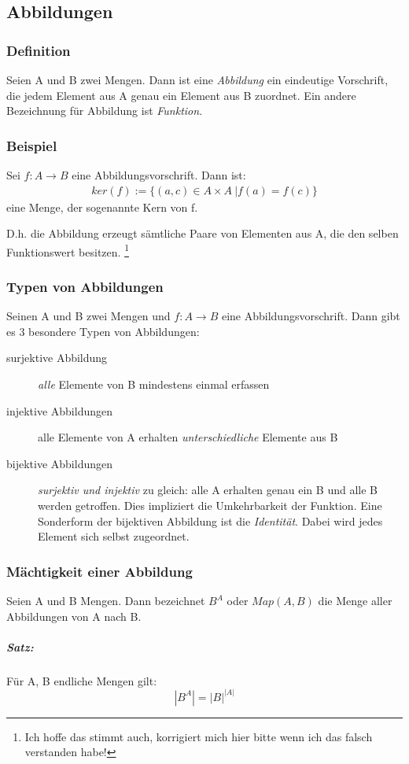 \subsection{Abbildungen}

\subsubsection{Definition}
Seien A und B zwei Mengen.
Dann ist eine \emph{Abbildung} ein eindeutige Vorschrift, die jedem Element aus A genau ein Element aus B zuordnet.
Ein andere Bezeichnung für Abbildung ist \emph{Funktion}.
\subsubsection{Beispiel}
Sei $f:{A}\longrightarrow{B}$ eine Abbildungsvorschrift.
Dann ist:
\begin{align*}
   ker(f) := \{(a,c) \in A \times A\ | f(a)=f(c)\}
\end{align*}
eine Menge, der sogenannte Kern von f.

D.h. die Abbildung erzeugt sämtliche Paare von Elementen aus A, die den selben
Funktionswert besitzen. \footnote{Ich hoffe das stimmt auch, korrigiert mich hier bitte wenn
  ich das falsch verstanden habe!}
\newpage
\subsubsection{Typen von Abbildungen}
Seinen A und B zwei Mengen und $f:{A}\longrightarrow{B}$ eine Abbildungsvorschrift.
Dann gibt es 3 besondere Typen von Abbildungen:

\begin{description}
\item[surjektive Abbildung] \emph{alle} Elemente von B mindestens einmal erfassen
\item[injektive Abbildungen] alle Elemente von A erhalten \emph{unterschiedliche} Elemente aus B
\item[bijektive Abbildungen] \emph{surjektiv und injektiv} zu gleich: alle A erhalten genau ein B und alle B werden getroffen.
Dies impliziert die Umkehrbarkeit der Funktion. Eine Sonderform der bijektiven
Abbildung ist die \emph{Identität}. Dabei wird jedes Element sich selbst zugeordnet.
\end{description}

\begin{figure}
\hfill
{}\hfill
{}\hfill
{}
\end{figure}

\subsubsection{Mächtigkeit einer Abbildung}
Seien A und B Mengen.
Dann bezeichnet $B^A$ oder $Map(A,B)$ die Menge aller Abbildungen von A nach B.
\subparagraph*{Satz:}
Für A, B endliche Mengen gilt:
$$ |B^A| = {|B|}^{|A|} $$